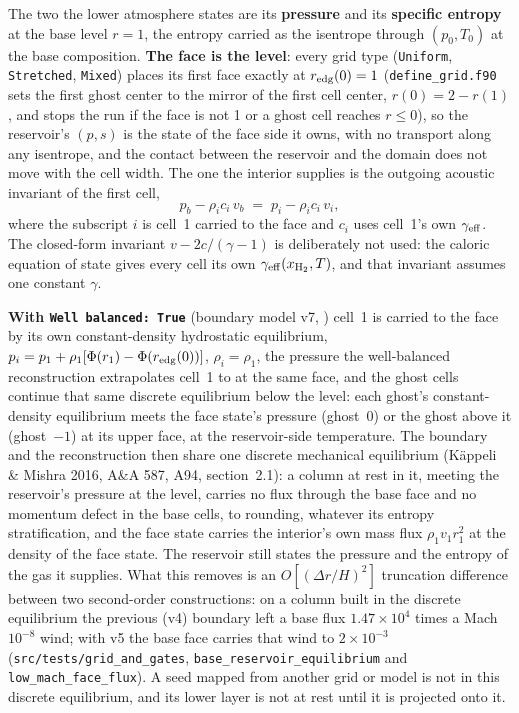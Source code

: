 \documentclass[english,a4paper]{my_memo}
\begin{document}
The two the lower atmosphere states are its \textbf{pressure} and its
\textbf{specific entropy} at the base level $r=1$, the entropy carried as the
isentrope through $(p_0, T_0)$ at the base composition. \textbf{The face is
the level}: every grid type (\texttt{Uniform}, \texttt{Stretched},
\texttt{Mixed}) places its first face exactly at $r_{\rm edg}(0)=1$
(\texttt{define\_grid.f90} sets the first ghost center to the mirror of the
first cell center, $r(0)=2-r(1)$, and stops the run if the face is not 1 or a
ghost cell reaches $r\le0$), so the reservoir's $(p,s)$ is the state of the
face side it owns, with no transport along any isentrope, and the contact
between the reservoir and the domain does not move with the cell width. The
one the interior supplies is
the outgoing acoustic invariant of the first cell,
\begin{equation}
  p_b - \rho_i c_i\, v_b \;=\; p_i - \rho_i c_i\, v_i ,
\end{equation}
where the subscript $i$ is cell~1 carried to the face and $c_i$ uses
cell~1's own $\gamma_{\rm eff}$. The closed-form invariant $v-2c/(\gamma-1)$
is deliberately not used: the caloric equation of state gives every cell its
own $\gamma_{\rm eff}(x_{\rm H_2},T)$, and that invariant assumes one constant
$\gamma$.

\textbf{With \texttt{Well balanced: True}} (boundary model v7,
) cell~1 is carried to the
face by its own constant-density hydrostatic equilibrium,
$p_i = p_1 + \rho_1[\Phi(r_1) - \Phi(r_{\rm edg}(0))]$, $\rho_i = \rho_1$, the
pressure the well-balanced reconstruction extrapolates cell~1 to at the same
face, and the ghost cells continue that same discrete equilibrium below the
level: each ghost's constant-density equilibrium meets the face state's
pressure (ghost~0) or the ghost above it (ghost~$-1$) at its upper face, at the
reservoir-side temperature. The boundary and the reconstruction then share one
discrete mechanical equilibrium (K\"appeli \& Mishra 2016, A\&A 587, A94,
section~2.1): a column at rest in it, meeting the reservoir's pressure at the
level, carries no flux through the base face and no momentum defect in the
base cells, to rounding, whatever its entropy stratification, and the face
state carries the interior's own mass flux $\rho_1 v_1 r_1^2$ at the density
of the face state. The reservoir still states the pressure and the entropy of
the gas it supplies. What this removes is an $O[(\Delta r/H)^2]$ truncation
difference between two second-order constructions: on a column built in the
discrete equilibrium the previous (v4) boundary left a base flux
$1.47\times10^4$ times a Mach $10^{-8}$ wind; with v5 the base face carries
that wind to $2\times10^{-3}$ (\texttt{src/tests/grid\_and\_gates},
\texttt{base\_reservoir\_equilibrium} and \texttt{low\_mach\_face\_flux}). A
seed mapped from another grid or model is not in this discrete equilibrium,
and its lower layer is not at rest until it is projected onto it.
\end{document}
